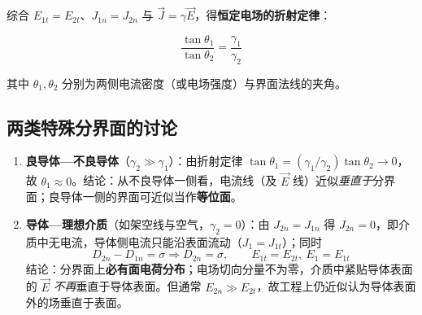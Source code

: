 综合 $E_{1t}=E_{2t}$、$J_{1n}=J_{2n}$ 与 $\vec{J}=\gamma\vec{E}$，得\textbf{恒定电场的折射定律}：
\begin{formulaBox}
\[
\frac{\tan\theta_1}{\tan\theta_2}=\frac{\gamma_1}{\gamma_2}
\]
\end{formulaBox}
其中 $\theta_1,\theta_2$ 分别为两侧电流密度（或电场强度）与界面法线的夹角。

\subsection{两类特殊分界面的讨论}
\begin{enumerate}
  \item \textbf{良导体—不良导体}（$\gamma_2\gg\gamma_1$）：由折射定律 $\tan\theta_1=(\gamma_1/\gamma_2)\tan\theta_2\to 0$，故 $\theta_1\approx0$。结论：从不良导体一侧看，电流线（及 $\vec{E}$ 线）近似\emph{垂直于}分界面；良导体一侧的界面可近似当作\textbf{等位面}。
  \item \textbf{导体—理想介质}（如架空线与空气，$\gamma_2=0$）：由 $J_{2n}=J_{1n}$ 得 $J_{2n}=0$，即介质中无电流，导体侧电流只能沿表面流动（$J_1=J_{1t}$）；同时
  \[
  D_{2n}-D_{1n}=\sigma \Rightarrow D_{2n}=\sigma,\qquad E_{1t}=E_{2t},\ E_1=E_{1t}
  \]
  结论：分界面上\textbf{必有面电荷分布}；电场切向分量不为零，介质中紧贴导体表面的 $\vec{E}$ \emph{不再}垂直于导体表面。但通常 $E_{2n}\gg E_{2t}$，故工程上仍近似认为导体表面外的场垂直于表面。
\end{enumerate}


